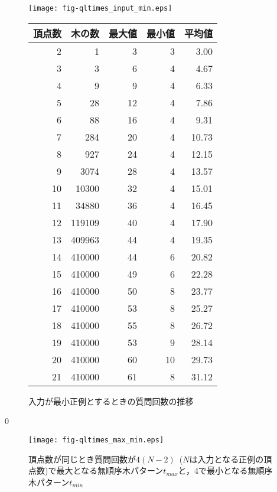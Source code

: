 \begin{figure}[tb]
  \begin{center}
    \texttt{[image: fig-qltimes\_input\_min.eps]}
    \caption{入力が最小正例とするときの質問回数の推移}\label{fig:qltimes_input_min}
  \vspace*{10.5pt}
    \label{tbl:qltimes_input_min}
    \begin{tabular}{rrrrr} \hline
      頂点数 &  木の数 & 最大値 & 最小値 & 平均値 \\ \hline\hline
          2 &      1 &     3 &     3 &  3.00 \\
          3 &      3 &     6 &     4 &  4.67 \\
          4 &      9 &     9 &     4 &  6.33 \\
          5 &     28 &    12 &     4 &  7.86 \\
          6 &     88 &    16 &     4 &  9.31 \\
          7 &    284 &    20 &     4 & 10.73 \\
          8 &    927 &    24 &     4 & 12.15 \\
          9 &   3074 &    28 &     4 & 13.57 \\
         10 &  10300 &    32 &     4 & 15.01 \\
         11 &  34880 &    36 &     4 & 16.45 \\
         12 & 119109 &    40 &     4 & 17.90 \\
         13 & 409963 &    44 &     4 & 19.35 \\
         14 & 410000 &    44 &     6 & 20.82 \\
         15 & 410000 &    49 &     6 & 22.28 \\
         16 & 410000 &    50 &     8 & 23.77 \\
         17 & 410000 &    53 &     8 & 25.27 \\
         18 & 410000 &    55 &     8 & 26.72 \\
         19 & 410000 &    53 &     9 & 28.14 \\
         20 & 410000 &    60 &    10 & 29.73 \\
         21 & 410000 &    61 &     8 & 31.12 \\ \hline
    \end{tabular}
  \end{center}
\end{figure}
0
\begin{figure}[tb]
  \centering
  \texttt{[image: fig-qltimes\_max\_min.eps]}
  \caption{頂点数が同じとき質問回数が$4(N-2)$~($N$は入力となる正例の頂点数)で最大となる無順序木パターン$t_{max}$と，4で最小となる無順序木パターン$t_{min}$}\label{fig:qltimes_max_min}
\end{figure}

